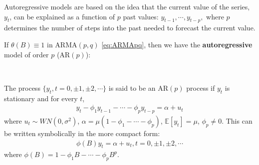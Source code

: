 Autoregressive models are based on the idea that the current value of the series,
$y_t$, can be explained as a function of $p$ past values: $y_{t-1}, \cdots, y_{t-p},$
where $p$ determines the number of steps into the past needed to forecast the current value.

If $\theta(B) \equiv 1$ in ARMA$(p,q)$ \ref{eq:ARMApq}, then we have the \textbf{autoregressive} model of order $p$ (AR$(p)$):
\begin{definition}[AR$(p)$ Process]\label{def:ARp}
    \
    
    The process $\{ y_t, t=0, \pm1, \pm2, \cdots\}$ is said to be an AR$(p)$ process if $y_t$ is stationary and for every $t$,
    \begin{gather}\label{eq:ARp}
        y_t - \phi_1 y_{t-1} - \cdots - \phi_p y_{t-p} = \alpha + u_t
    \end{gather}
    where $u_t \sim WN(0,\sigma^2)$, $\alpha = \mu \left( 1-\phi_1 - \cdots - \phi_p \right)$, $\mathbb{E}[y_t] = \mu$, $\phi_p \neq 0.$
    This can be written symbolically in the more compact form:
    \begin{gather*}
        \phi (B) y_t = \alpha + u_t, t = 0, \pm1, \pm2, \cdots
    \end{gather*}
    where $\phi (B) = 1 - \phi_1 B - \cdots - \phi_p B^p$.
\end{definition}

